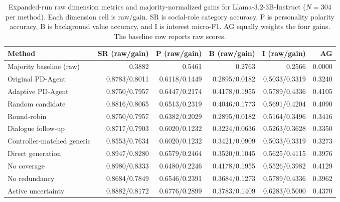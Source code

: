 \documentclass{ieeeaccess}
\begin{document}
\clearpage
\renewcommand{\thetable}{S3c}
\begin{table}[H]
\centering
\footnotesize
\setlength{\tabcolsep}{4pt}
\caption{Expanded-run raw dimension metrics and majority-normalized gains for Llama-3.2-3B-Instruct ($N=304$ per method). Each dimension cell is raw/gain. SR is social-role category
accuracy, P is personality polarity accuracy, B is background value accuracy, and I is
interest micro-F1. AG equally weights the four gains. The baseline row reports raw scores.}
\label{tab:expanded-raw-llama}
\begin{tabular*}{\textwidth}{@{\extracolsep{\fill}}lrrrrr@{}}
\toprule
Method & SR (raw/gain) & P (raw/gain) & B (raw/gain) & I (raw/gain) & AG \\
\midrule
Majority baseline (raw) & 0.3882 & 0.5461 & 0.2763 & 0.2566 & 0.0000 \\
\midrule
Original PD-Agent & 0.8783/0.8011 & 0.6118/0.1449 & 0.2895/0.0182 & 0.5033/0.3319 & 0.3240 \\
Adaptive PD-Agent & 0.8750/0.7957 & 0.6447/0.2174 & 0.4178/0.1955 & 0.5789/0.4336 & 0.4105 \\
Random candidate & 0.8816/0.8065 & 0.6513/0.2319 & 0.4046/0.1773 & 0.5691/0.4204 & 0.4090 \\
Round-robin & 0.8750/0.7957 & 0.6382/0.2029 & 0.2895/0.0182 & 0.5164/0.3496 & 0.3416 \\
Dialogue follow-up & 0.8717/0.7903 & 0.6020/0.1232 & 0.3224/0.0636 & 0.5263/0.3628 & 0.3350 \\
Controller-matched generic & 0.8553/0.7634 & 0.6020/0.1232 & 0.3421/0.0909 & 0.5033/0.3319 & 0.3273 \\
Direct generation & 0.8947/0.8280 & 0.6579/0.2464 & 0.3520/0.1045 & 0.5625/0.4115 & 0.3976 \\
No coverage & 0.8980/0.8333 & 0.6480/0.2246 & 0.4178/0.1955 & 0.5526/0.3982 & 0.4129 \\
No redundancy & 0.8684/0.7849 & 0.6546/0.2391 & 0.3684/0.1273 & 0.5789/0.4336 & 0.3962 \\
Active uncertainty & 0.8882/0.8172 & 0.6776/0.2899 & 0.3783/0.1409 & 0.6283/0.5000 & 0.4370 \\
\bottomrule
\end{tabular*}
\end{table}
\end{document}
